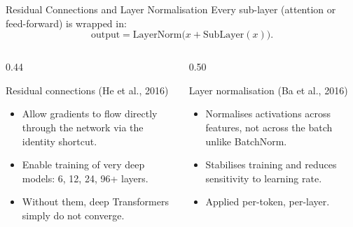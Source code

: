 \documentclass[aspectratio=169]{beamer}
\begin{document}
%
%
\begin{frame}{Residual Connections and Layer Normalisation}
  Every sub-layer (attention or feed-forward) is wrapped in:
  \[
    \mathrm{output} = \mathrm{LayerNorm}\!\bigl(x + \mathrm{SubLayer}(x)\bigr).
  \]

  \begin{columns}[t]
    \begin{column}{0.44\textwidth}
      \begin{block}{Residual connections (He et al., 2016)}
        \begin{itemize}
          \item Allow gradients to flow directly through the network via the identity
                shortcut.
          \item Enable training of very deep models: 6, 12, 24, 96+ layers.
          \item Without them, deep Transformers simply do not converge.
        \end{itemize}
      \end{block}
    \end{column}
    \begin{column}{0.50\textwidth}
      \begin{block}{Layer normalisation (Ba et al., 2016)}
        \begin{itemize}
          \item Normalises activations across features, not across the batch unlike
                BatchNorm.
          \item Stabilises training and reduces sensitivity to learning rate.
          \item Applied per-token, per-layer.
        \end{itemize}
      \end{block}
    \end{column}
  \end{columns}
\end{frame}
%
%
\end{document}
